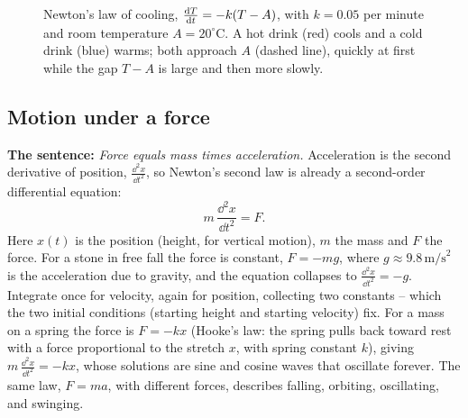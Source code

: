 \begin{figure}[htbp]
\centering
{}
\caption{Newton's law of cooling, $\frac{\mathrm{d} T}{\mathrm{d} t}=-k(T-A)$, with $k=0.05$ per minute and room temperature $A=20^\circ$C. A hot drink (red) cools and a cold drink (blue) warms; both approach $A$ (dashed line), quickly at first while the gap $T-A$ is large and then more slowly.}
\label{ch36:fig-cooling}
\end{figure}

\subsection{Motion under a force}

\begin{applicationbox}
\textbf{The sentence:} \emph{Force equals mass times acceleration.} Acceleration is the second derivative of position, $\frac{\dd^2 x}{\dd t^2}$, so Newton's second law is already a second-order differential equation:
\[
  m\,\frac{\dd^2 x}{\dd t^2} = F.
\]
Here $x(t)$ is the position (height, for vertical motion), $m$ the mass and $F$ the force. For a stone in free fall the force is constant, $F = -mg$, where $g \approx 9.8\,\text{m/s}^2$ is the acceleration due to gravity, and the equation collapses to $\frac{\dd^2 x}{\dd t^2} = -g$. Integrate once for velocity, again for position, collecting two constants -- which the two initial conditions (starting height and starting velocity) fix. For a mass on a spring the force is $F = -kx$ (Hooke's law: the spring pulls back toward rest with a force proportional to the stretch $x$, with spring constant $k$), giving $m\,\frac{\dd^2 x}{\dd t^2} = -kx$, whose solutions are sine and cosine waves that oscillate forever. The same law, $F = ma$, with different forces, describes falling, orbiting, oscillating, and swinging.
\end{applicationbox}

